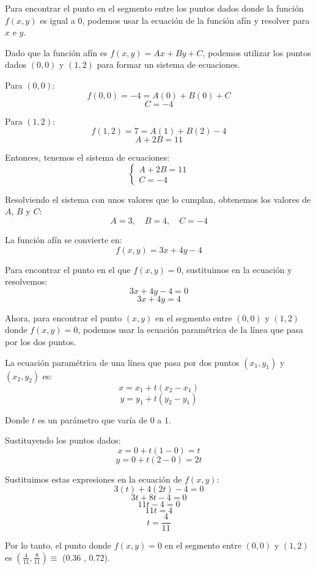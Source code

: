 \documentclass{article}
\begin{document}
\noindent Para encontrar el punto en el segmento entre los puntos dados donde la función $f(x, y)$ es igual a $0$, podemos usar la ecuación de la función afín y resolver para $x$ e $y$.

Dado que la función afín es $f(x, y) = Ax + By + C$, podemos utilizar los puntos dados $(0, 0)$ y $(1, 2)$ para formar un sistema de ecuaciones.

Para $(0, 0)$:
\[f(0, 0) = -4 = A(0) + B(0) + C\]
\[C = -4\]

Para $(1, 2)$:
\[f(1, 2) = 7 = A(1) + B(2) - 4\]
\[A + 2B = 11\]

Entonces, tenemos el sistema de ecuaciones:
\[\begin{cases} A + 2B = 11 \\ C = -4 \end{cases}\]

Resolviendo el sistema con unos valores que lo cumplan, obtenemos los valores de $A$, $B$ y $C$:
\[A = 3, \quad B = 4, \quad C = -4\]

La función afín se convierte en:
\[f(x, y) = 3x + 4y - 4\]

Para encontrar el punto en el que $f(x, y) = 0$, sustituimos en la ecuación y resolvemos:
\[3x + 4y - 4 = 0\]
\[3x + 4y = 4\]

Ahora, para encontrar el punto $(x, y)$ en el segmento entre $(0, 0)$ y $(1, 2)$ donde $f(x, y) = 0$, podemos usar la ecuación paramétrica de la línea que pasa por los dos puntos.

La ecuación paramétrica de una línea que pasa por dos puntos $(x_1, y_1)$ y $(x_2, y_2)$ es:
\[x = x_1 + t(x_2 - x_1)\]
\[y = y_1 + t(y_2 - y_1)\]

Donde $t$ es un parámetro que varía de $0$ a $1$.

Sustituyendo los puntos dados:
\[x = 0 + t(1 - 0) = t\]
\[y = 0 + t(2 - 0) = 2t\]

Sustituimos estas expresiones en la ecuación de $f(x, y)$:
\[3(t) + 4(2t) - 4 = 0\]
\[3t + 8t - 4 = 0\]
\[11t - 4 = 0\]
\[11t = 4\]
\[t = \frac{4}{11}\]

Por lo tanto, el punto donde $f(x, y) = 0$ 
en el segmento entre $(0, 0)$ y $(1, 2)$ es $(\frac{4}{11}, \frac{8}{11})\equiv$ (0.36 , 0.72).
\end{document}
